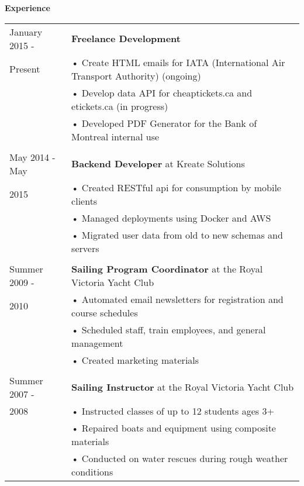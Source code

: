 \documentclass[notitlepage,oneside,draft]{article}
\begin{document}
\begin{flushleft}
  \large
  \textbf{Experience} \\
  \vspace{12pt}
  \normalsize
  \begin{tabular}{ p{86pt} | l}
    January 2015 - & \textbf{Freelance Development} \\
    Present & • Create HTML emails for IATA (International Air Transport Authority) (ongoing) \\
    & • Develop data API for cheaptickets.ca and etickets.ca (in progress) \\
    & • Developed PDF Generator for the Bank of Montreal internal use \\
    & \\
    May 2014 - May & \textbf{Backend Developer} at Kreate Solutions \\
    2015 & • Created RESTful api for consumption by mobile clients \\
    & • Managed deployments using Docker and AWS \\
    & • Migrated user data from old to new schemas and servers \\
    & \\
    Summer 2009 - & \textbf{Sailing Program Coordinator} at the Royal Victoria Yacht Club \\
    2010 & • Automated email newsletters for registration and course schedules \\
    & • Scheduled staff, train employees, and general management \\
    & • Created marketing materials \\
    & \\
    Summer 2007 - & \textbf{Sailing Instructor} at the Royal Victoria Yacht Club \\
    2008 & • Instructed classes of up to 12 students ages 3+ \\
    & • Repaired boats and equipment using composite materials \\
    & • Conducted on water rescues during rough weather conditions \\
  \end{tabular}
  \vspace{24pt}



\end{flushleft}
\end{document}
